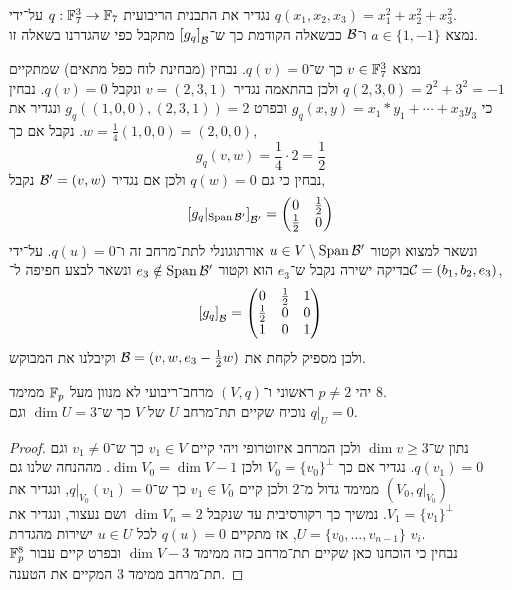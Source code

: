 \question{}
נגדיר את התבנית הריבועית $q : \mathbb{F}_7^3 \to \mathbb{F}_7$ על־ידי $q(x_1, x_2, x_3) = x_1^2 + x_2^2 + x_3^2$. \\
נמצא $a \in \{1, -1\}$ ו־$\mathcal{B}$ כבשאלה הקודמת כך ש־${[g_q]}_{\mathcal{B}}$ מתקבל כפי שהגדרנו בשאלה זו.
\begin{solution}
	נמצא $v \in \mathbb{F}_7^3$ כך ש־$q(v) = 0$.
	נבחין (מבחינת לוח כפל מתאים) שמתקיים $q(2, 3, 0) = 2^2 + 3^2 = -1$ ולכן בהתאמה נגדיר $v = (2, 3, 1)$ ונקבל $q(v) = 0$.
	נבחין כי $g_q(x, y) = x_1 * y_1 + \cdots + x_3 y_3$ ובפרט $g_q((1, 0, 0), (2, 3, 1)) = 2$ ונגדיר את $w = \frac{1}{4} (1, 0, 0) = (2, 0, 0)$.
	נקבל אם כך,
	\[
		g_q(v, w)
		= \frac{1}{4} \cdot 2
		= \frac{1}{2}
	\]
	נבחין כי גם $q(w) = 0$ ולכן אם נגדיר $\mathcal{B}' = (v, w)$ נקבל,
	\[
		{[g_q|_{\operatorname{Span} \mathcal{B}'}]}_{\mathcal{B}'}
		= \begin{pmatrix}
			0 & \frac{1}{2} \\
			\frac{1}{2} & 0
		\end{pmatrix}
	\]
	ונשאר למצוא וקטור $u \in V \setminus \operatorname{Span} \mathcal{B}'$ אורתוגונלי לתת־מרחב זה ו־$q(u) = 0$.
	על־ידי בדיקה ישירה נקבל ש־$e_3$ הוא וקטור $e_3 \notin \operatorname{Span} \mathcal{B}'$ ונשאר לבצע חפיפה ל־$\mathcal{C} = (b_1, b_2, e_3)$,
	\[
		{[g_q]}_{\mathcal{B}}
		= \begin{pmatrix}
			0 & \frac{1}{2} & 1 \\
			\frac{1}{2} & 0 & 0 \\
			1 & 0 & 1
		\end{pmatrix}
	\]
	ולכן מספיק לקחת את $\mathcal{B} = (v, w, e_3 - \frac{1}{2} w)$ וקיבלנו את המבוקש.
\end{solution}

\question{}
יהי $p \ne 2$ ראשוני ו־$(V, q)$ מרחב־ריבועי לא מנוון מעל $\mathbb{F}_p$ ממימד $8$. \\
נוכיח שקיים תת־מרחב $U$ של $V$ כך ש־$\dim U = 3$ וגם $q|_U = 0$.
\begin{proof}
	נתון ש־$\dim v \ge 3$ ולכן המרחב איזוטרופי ויהי קיים $v_1 \in V$ כך ש־$v_1 \ne 0$ וגם $q(v_1) = 0$.
	נגדיר אם כך $V_0 = {\{ v_0 \}}^\perp$ ולכן $\dim V_0 = \dim V - 1$.
	מההנחה שלנו גם $(V_0, q|_{V_0})$ ממימד גדול מ־$2$ ולכן קיים $v_1 \in V_0$ כך ש־$q|_{V_0}(v_1) = 0$, ונגדיר את $V_1 = {\{ v_1 \}}^\perp$.
	נמשיך כך רקורסיבית עד שנקבל $\dim V_n = 2$ ושם נעצור, ונגדיר את $U = \{ v_0, \ldots, v_{n - 1} \}$, אז מתקיים $q(u) = 0$ לכל $u \in U$ ישירות מהגדרת $v_i$. \\
	נבחין כי הוכחנו כאן שקיים תת־מרחב כזה ממימד $\dim V - 3$ ובפרט קיים עבור $\mathbb{F}_p^8$ תת־מרחב ממימד $3$ המקיים את הטענה.
\end{proof}

